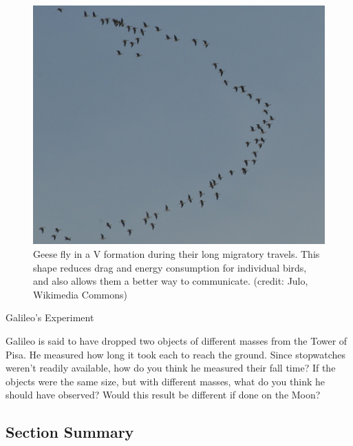 \documentclass[
]{book}
\begin{document}
\begin{figure}
\hypertarget{import-auto-id1165298645387}{%
\centering
\includegraphics{images/Figure_06_02_06a.jpg}
\caption{Geese fly in a V formation during their long migratory travels. This
shape reduces drag and energy consumption for individual birds, and also
allows them a better way to communicate. (credit: Julo, Wikimedia
Commons)}\label{import-auto-id1165298645387}
}
\end{figure}

\hypertarget{fs-id1165298544129}{}
Galileo's Experiment

Galileo is said to have dropped two objects of different masses from the
Tower of Pisa. He measured how long it took each to reach the ground.
Since stopwatches weren't readily available, how do you think he
measured their fall time? If the objects were the same size, but with
different masses, what do you think he should have observed? Would this
result be different if done on the Moon?

\hypertarget{fs-id1165298931707-summary}{}
\hypertarget{section-summary-15}{%
\subsection{Section Summary}\label{section-summary-15}}
\end{document}

